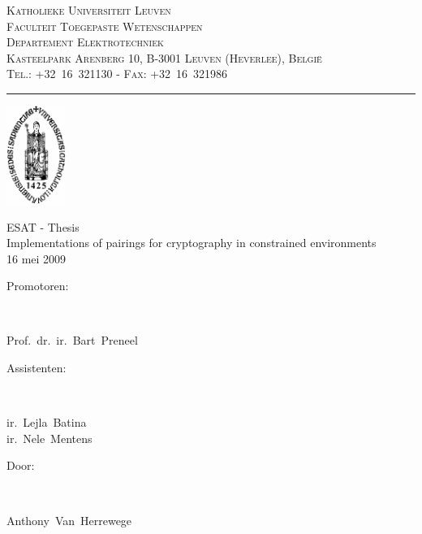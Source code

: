 \documentclass[a4paper]{article}    %
\newcommand{\vak}{ESAT - Thesis}
\newcommand{\opgave}{Implementations of pairings for cryptography in constrained environments}
\newcommand{\titel}{{\LARGE \vak}\\[2mm]
{\Large \opgave}}
\newcommand{\datum}{16 mei 2009}
\newcommand{\departement}{Departement Elektrotechniek}
\newcommand{\depadres}{Kasteelpark Arenberg 10, B-3001 Leuven (Heverlee), Belgi\"e}
\newcommand{\depcontact}{Tel.: +32~16~321130 - Fax: +32~16~321986}
\newcommand{\professoren}{Prof.~dr.~ir.~Bart~Preneel}
\newcommand{\assistenten}{ir.~Lejla~Batina\\ir.~Nele~Mentens}
\newcommand{\student}{Anthony~Van~Herrewege}
\begin{document}
\thispagestyle{empty}

\begin{minipage}[c]{100mm}
\small
\textsc{Katholieke Universiteit Leuven\\
Faculteit Toegepaste Wetenschappen\\
\departement\\[3mm]
\depadres\\
\depcontact}
\end{minipage}
\hfill
\begin{minipage}{45mm}
\parbox[b]{15mm}{\rule{1pt}{32mm}}
\includegraphics[height=32mm,bb=0 0 309 520]{voorblad-sedes}
\end{minipage}


\begin{center}
\parbox[c]{0.7\textwidth}{
    \centering
    \textsf{\titel\\[6mm]
            {\small \datum}}
}
\end{center}


\begin{minipage}{60mm}
\textsf{{\large Promotoren:\\}}
\parbox[t]{3mm}{~}
\parbox[t]{70mm}{\textsf{\professoren}\\[3mm]}
\textsf{{\large Assistenten:}}\\
\parbox[t]{3mm}{~}
\parbox[t]{50mm}{\textsf{\assistenten}}
\end{minipage}
\hfill
\begin{minipage}{50mm}
\textsf{{\large Door:\\}}
\parbox[t]{3mm}{~}
\parbox[t]{60mm}{\textsf{\student}}
\end{minipage}
\end{document}
